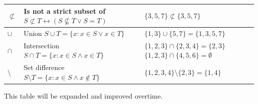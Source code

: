 \documentclass[a4paper, twoside]{article}
\newcommand{\ioi}{\longleftrightarrow}
\newcommand{\nsubset}{\not\subset}
\begin{document}
\begin{table}[H]
\begin{tabular}{|>{\centering\arraybackslash}m{2.5cm}|m{5cm}|>{\centering\arraybackslash}m{4cm}|}
        \\\hline
        \(\nsubset\) &
        \makecell[l]{
            Is not a strict subset of \\
            \(S \nsubset T \ioi ( S \nsubseteq T \lor S = T )\)
        } &
        \( \{3, 5, 7\} \nsubset \{3, 5, 7\} \)
        \\\hline
        \(\cup\) &
        \makecell[l]{
            Union \\
            \(S \cup T = \{x : x\in S \lor x \in T \}\)
        } &
        \(\{1, 3\} \cup \{5, 7\} = \{1, 3, 5, 7\} \)
        \\\hline
        \(\cap\) &
        \makecell[l]{
            Intersection \\
            \( S \cap T = \{ x : x \in S \land x \in T \} \)
        } &
        \makecell[l]{
            \( \{ 1, 2, 3 \} \cap \{2, 3, 4\} = \{2, 3\} \) \\
            \( \{ 1,2,3 \} \cap \{4, 5, 6\} = \emptyset \)
        }
        \\\hline
        \(\setminus\) &
        \makecell[l]{
            Set difference \\
            \( S \setminus T = \{ x : x \in S \land x \notin T \} \)
        } &
        \( \{ 1,2,3,4 \} \setminus \{2,3\} = \{ 1,4 \} \)
        \\\hline
    \end{tabular}
\end{table}




This table will be expanded and improved overtime.
\end{document}
